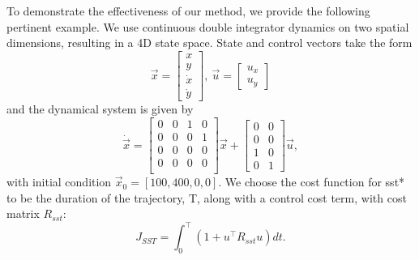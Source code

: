 To demonstrate the effectiveness of our method, we provide the following pertinent example. We use continuous double integrator dynamics on two spatial dimensions, resulting in a 4D state space. State and control vectors take the form
\begin{equation}
    \vec{x} =  \begin{bmatrix}
                    x \\
                    y \\
                    \dot x \\
                    \dot y
                \end{bmatrix},
    \ \vec{u} =  \begin{bmatrix}
                    u_x \\
                    u_y
                \end{bmatrix}
\end{equation}
and the dynamical system is given by
\begin{equation}
    \dot{\vec{x}} = %
                        \begin{bmatrix}
                            0 & 0 & 1 & 0 \\
                            0 & 0 & 0 & 1 \\
                            0 & 0 & 0 & 0 \\
                            0 & 0 & 0 & 0 \\
                        \end{bmatrix} \vec{x} +
                        \begin{bmatrix}
                            0 & 0 \\
                            0 & 0 \\
                            1 & 0 \\
                            0 & 1  
                        \end{bmatrix} \vec{u},
\end{equation}
with initial condition $\vec{x}_0 = [100, 400, 0, 0]$.
We choose the cost function for \gls{sst}* to be the duration of the trajectory, T, along with a control cost term, with cost matrix $R_{sst}$:
\begin{equation}
    J_{SST} = \int_0^\top \left( 1 + u^\top R_{sst} u \right ) dt.
\end{equation}
